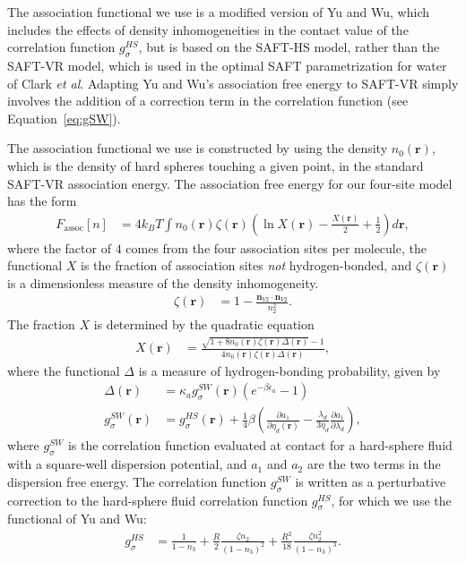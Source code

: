 \documentclass[twocolumn,amsmath,amssymb,prl]{revtex4-1}
\newcommand{\xx}{\textbf{r}}
\newcommand\etadisp{\ensuremath{\eta_\textit{d}}}
\newcommand\epsilonassoc{\ensuremath{\epsilon_\textit{a}}}
\newcommand\kappaassoc{\ensuremath{\kappa_\textit{a}}}
\newcommand\lambdadisp{\ensuremath{\lambda_\textit{d}}}
\begin{document}
The association functional we use is a modified version of Yu
and Wu\cite{yu2002fmt-dft-inhomogeneous-associating}, which
includes the effects of density inhomogeneities in the contact value
of the correlation function $g^{HS}_\sigma$, but is based on the
SAFT-HS model, rather than the SAFT-VR
model\cite{gil-villegas-1997-SAFT-VR}, which is used in the optimal
SAFT parametrization for water of Clark \emph{et
  al}\cite{clark2006developing}.  Adapting Yu and Wu's association
free energy to SAFT-VR simply involves the addition of a correction
term in the correlation function (see Equation~\ref{eq:gSW}).

The association functional we use is constructed by using the density
$n_0(\xx)$, which is the density of hard spheres touching a given
point, in the standard SAFT-VR association
energy\cite{gil-villegas-1997-SAFT-VR}.
The association free energy for our four-site model has the form
\begin{align}
  F_\text{assoc}[n] &= 4 k_BT \int n_0(\xx) \zeta(\xx)
  \left(\ln X(\xx) - \frac{X(\xx)}{2} + \frac12\right) d\xx,
\end{align}
where the factor of $4$ comes from the four association sites per
molecule, the functional $X$ is the fraction of association sites
\emph{not} hydrogen-bonded, and $\zeta(\xx)$ is a dimensionless
measure of the density inhomogeneity.
\begin{align}
  \zeta(\xx) &= 1 - \frac{\mathbf{n}_{V2}\cdot\mathbf{n}_{V2}}{n_2^2}.
\end{align}
%
The fraction $X$ is determined by the quadratic equation
\begin{align}
  X(\xx) &= \frac{\sqrt{1 + 8n_0(\xx)\zeta(\xx)
      \Delta(\xx)} - 1}
  {4 n_0(\xx)\zeta(\xx)
    \Delta(\xx)},
\end{align}
where the functional $\Delta$ is a measure of hydrogen-bonding
probability, given by
\begin{align}
  \Delta(\xx) &= \kappaassoc g^\textit{SW}_\sigma(\xx)
  \left(e^{-\beta\epsilonassoc} - 1\right) \\
  g^\textit{SW}_\sigma(\xx) &= g^\textit{HS}_\sigma(\xx) +
  \frac{1}{4}\beta\left(\frac{\partial a_1}{\partial \etadisp(\xx)} -
  \frac{\lambdadisp}{3 \etadisp}\frac{\partial a_1}{\partial \lambdadisp}\right)\label{eq:gSW},
\end{align}
where $g^\textit{SW}_\sigma$ is the correlation function evaluated at
contact for a hard-sphere fluid with a square-well dispersion
potential, and $a_1$ and $a_2$ are the two terms in the dispersion
free energy.  The correlation function $g^\textit{SW}_\sigma$ is
written as a perturbative correction to the hard-sphere fluid
correlation function $g^\textit{HS}_\sigma$, for which we use the
functional of Yu and Wu\cite{yu2002fmt-dft-inhomogeneous-associating}:
\begin{align}
  g_\sigma^{HS} &= \frac{1}{1-n_3}
  +\frac{R}{2}\frac{\zeta n_2}{(1-n_3)^2}
  + \frac{R^2}{18}\frac{\zeta n_2^2}{(1-n_3)^3}.
\end{align}
\end{document}
